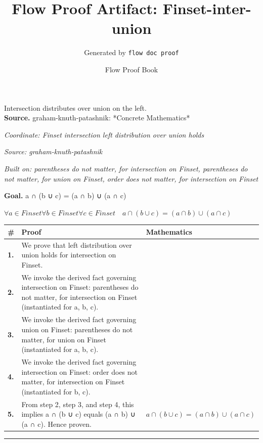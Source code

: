 \documentclass[11pt]{article}
\title{Flow Proof Artifact: Finset-inter-union}
\author{Generated by \texttt{flow doc proof}}
\date{Flow Proof Book}
\theoremstyle{definition}
\begin{document}
\maketitle
Intersection distributes over union on the left.\\[0.5em]
\textbf{Source.} graham-knuth-patashnik: *Concrete Mathematics*\\[0.5em]
\bigskip
{}\par
\smallskip\noindent\textit{Coordinate: Finset \cdot intersection \cdot left distribution over union holds}\par
\smallskip\noindent\textit{Source: graham-knuth-patashnik}\par
\smallskip\noindent\textit{Built on: parentheses do not matter, for intersection on Finset, parentheses do not matter, for union on Finset, order does not matter, for intersection on Finset}\par
\medskip
\noindent\textbf{Goal.} a ∩ (b ∪ c) = (a ∩ b) ∪ (a ∩ c)\par
\noindent$\displaystyle \forall a \in Finset \forall b \in Finset \forall c \in Finset\quad a ∩ (b ∪ c) = (a ∩ b) ∪ (a ∩ c)$\par
\medskip
\noindent
\begin{tabular}{@{} >{\raggedright\arraybackslash}p{} >{\raggedright\arraybackslash}p{} >{\raggedleft\arraybackslash}p{} @{}}
\textbf{\#} & \textbf{Proof} & \textbf{Mathematics} \\
\midrule
\textbf{1.} & We prove that left distribution over union holds for intersection on Finset. & \\[0.45em]
\textbf{2.} & We invoke the derived fact governing intersection on Finset: parentheses do not matter, for intersection on Finset (instantiated for a, b, c). & \\[0.45em]
\textbf{3.} & We invoke the derived fact governing union on Finset: parentheses do not matter, for union on Finset (instantiated for a, b, c). & \\[0.45em]
\textbf{4.} & We invoke the derived fact governing intersection on Finset: order does not matter, for intersection on Finset (instantiated for b, c). & \\[0.45em]
\textbf{5.} & From step 2, step 3, and step 4, this implies a ∩ (b ∪ c) equals (a ∩ b) ∪ (a ∩ c). Hence proven. & $\displaystyle a ∩ (b ∪ c) = (a ∩ b) ∪ (a ∩ c)$ \\[0.45em]
\bottomrule
\end{tabular}
\label{thm:Finset-intersection-left_distribution_over_union_holds}
\par\medskip\hrule
\end{document}
